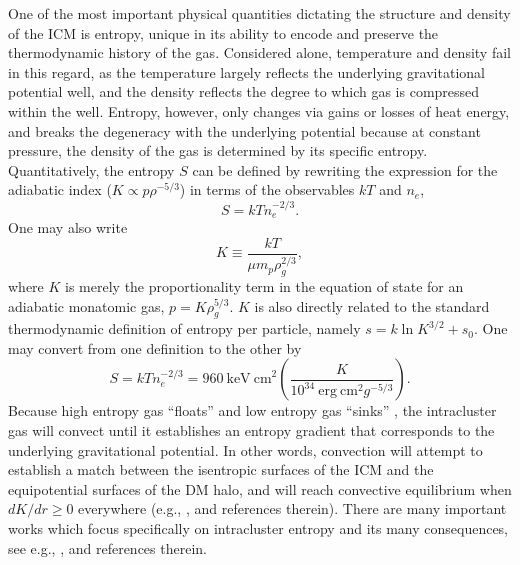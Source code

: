 One of the most important physical quantities dictating the structure and density of the ICM 
is entropy, unique in its ability to encode and preserve the thermodynamic history of the gas. Considered alone, temperature and density fail in this regard, 
as the temperature largely reflects the underlying gravitational potential well, and 
the density reflects the degree to which gas is compressed within the well.
Entropy, however, only changes via gains or losses of heat energy, and breaks the degeneracy with the underlying potential because 
at constant pressure, the density of the gas is determined by 
its specific entropy. Quantitatively, the entropy $S$ can be defined by rewriting the expression 
for the adiabatic index ($K\propto p\rho^{-5/3}$) in 
terms of the observables $kT$ and $n_e$,  
\begin{equation}
S=k T n_e^{-2/3}. 
\end{equation}
One may also write
\begin{equation}
K \equiv \frac{k T}{\mu m_p \rho_g^{2/3}},
\end{equation}
where $K$ is merely the proportionality term in the equation of state for an 
adiabatic monatomic gas, $p = K \rho_g^{5/3}$. $K$ is also directly related to the standard thermodynamic definition of entropy per particle, 
namely $s= k \ln K^{3/2} + s_0$. 
One may convert from one definition to the other 
by 
\begin{equation}
S = k T n_e^{-2/3} = 960~\mathrm{keV~cm}^2 \left( \frac{K}{10^{34}~\mathrm{erg~cm}^2 g^{-5/3}} \right). 
\end{equation}
Because high 
entropy gas ``floats'' and low entropy gas ``sinks'' \citep{voit05}, 
the intracluster gas will convect until it establishes 
an entropy gradient that corresponds to the underlying gravitational potential. 
In other words, convection will attempt to establish a match between the    
isentropic surfaces of the ICM and the equipotential surfaces of the DM halo, and will reach 
convective equilibrium when $dK/dr \ge 0$ everywhere (e.g., \citealt{voit05}, and references therein).
There are many important works which focus specifically on intracluster entropy and its many consequences,  see 
e.g., \citet{lloyd00,voit02,piffaretti05,pratt06,donahue06,cavagnolo09}, and references therein.



